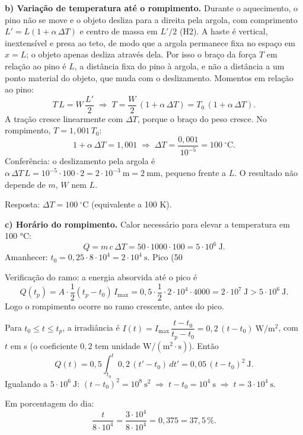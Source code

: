 \documentclass{article}%
\begin{document}
\textbf{b) Variação de temperatura até o rompimento.}
Durante o aquecimento, o pino não se move e o objeto desliza para a direita pela argola, com comprimento $L' = L(1+\alpha\,\Delta T)$ e centro de massa em $L'/2$ (H2). A haste é vertical, inextensível e presa ao teto, de modo que a argola permanece fixa no espaço em $x = L$; o objeto apenas desliza através dela. Por isso o braço da força $T$ em relação ao pino é $L$, a distância fixa do pino à argola, e não a distância a um ponto material do objeto, que muda com o deslizamento. Momentos em relação ao pino:
\[
T\,L = W\,\frac{L'}{2} \;\Rightarrow\; T = \frac{W}{2}\,(1+\alpha\,\Delta T) = T_0\,(1+\alpha\,\Delta T).
\]
A tração cresce linearmente com $\Delta T$, porque o braço do peso cresce. No rompimento, $T = 1{,}001\,T_0$:
\[
1+\alpha\,\Delta T = 1{,}001 \;\Rightarrow\; \Delta T = \frac{0{,}001}{10^{-5}} = 100\ ^{\circ}\mathrm{C}.
\]
Conferência: o deslizamento pela argola é $\alpha\,\Delta T\,L = 10^{-5}\cdot 100\cdot 2 = 2\cdot 10^{-3}\ \mathrm{m} = 2\ \mathrm{mm}$, pequeno frente a $L$. O resultado não depende de $m$, $W$ nem $L$.

Resposta: $\Delta T = 100\ ^{\circ}\mathrm{C}$ (equivalente a 100 K).

\textbf{c) Horário do rompimento.}
Calor necessário para elevar a temperatura em 100 °C:
\[
Q = m\,c\,\Delta T = 50\cdot 1000\cdot 100 = 5\cdot 10^{6}\ \mathrm{J}.
\]
Amanhecer: $t_0 = 0{,}25\cdot 8\cdot 10^{4} = 2\cdot 10^{4}\ \mathrm{s}$. Pico (50 %

Verificação do ramo: a energia absorvida até o pico é
\[
Q(t_p) = A\cdot\frac{1}{2}(t_p - t_0)\,I_{\max} = 0{,}5\cdot\frac{1}{2}\cdot 2\cdot 10^{4}\cdot 4000 = 2\cdot 10^{7}\ \mathrm{J} > 5\cdot 10^{6}\ \mathrm{J}.
\]
Logo o rompimento ocorre no ramo crescente, antes do pico.

Para $t_0 \le t \le t_p$, a irradiância é $I(t) = I_{\max}\,\dfrac{t-t_0}{t_p-t_0} = 0{,}2\,(t-t_0)\ \mathrm{W/m^2}$, com $t$ em s (o coeficiente $0{,}2$ tem unidade $\mathrm{W/(m^2\cdot s)}$). Então
\[
Q(t) = 0{,}5\int_{t_0}^{t} 0{,}2\,(t'-t_0)\,dt' = 0{,}05\,(t-t_0)^2\ \mathrm{J}.
\]
Igualando a $5\cdot 10^{6}\ \mathrm{J}$: $(t-t_0)^2 = 10^{8}\ \mathrm{s}^2 \;\Rightarrow\; t - t_0 = 10^{4}\ \mathrm{s} \;\Rightarrow\; t = 3\cdot 10^{4}\ \mathrm{s}$.

Em porcentagem do dia:
\[
\frac{t}{8\cdot 10^{4}} = \frac{3\cdot 10^{4}}{8\cdot 10^{4}} = 0{,}375 = 37{,}5\,\%.
\]
\end{document}
